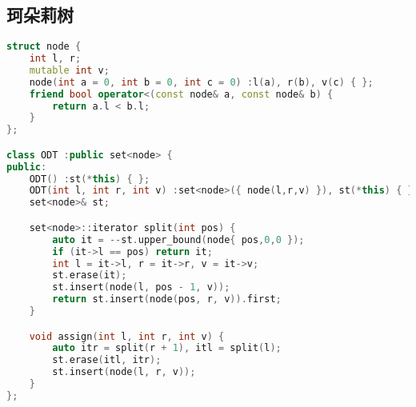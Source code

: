 \subsection{珂朵莉树}
\begin{lstlisting}[language=c++]
struct node {
    int l, r;
    mutable int v;
    node(int a = 0, int b = 0, int c = 0) :l(a), r(b), v(c) { };
    friend bool operator<(const node& a, const node& b) {
        return a.l < b.l;
    }
};

class ODT :public set<node> {
public:
    ODT() :st(*this) { };
    ODT(int l, int r, int v) :set<node>({ node(l,r,v) }), st(*this) { };
    set<node>& st;

    set<node>::iterator split(int pos) {
        auto it = --st.upper_bound(node{ pos,0,0 });
        if (it->l == pos) return it;
        int l = it->l, r = it->r, v = it->v;
        st.erase(it);
        st.insert(node(l, pos - 1, v));
        return st.insert(node(pos, r, v)).first;
    }

    void assign(int l, int r, int v) {
        auto itr = split(r + 1), itl = split(l);
        st.erase(itl, itr);
        st.insert(node(l, r, v));
    }
};   
\end{lstlisting}